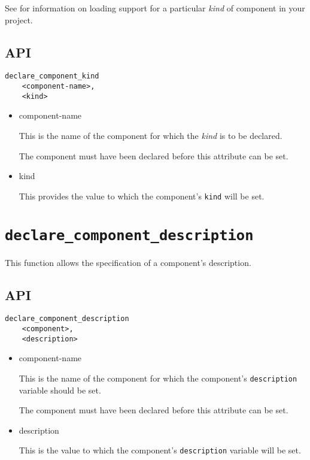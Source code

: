 See  for information on
loading support for a particular \emph{kind} of component in your
project.

\subsection{API}

\begin{verbatim}
declare_component_kind
    <component-name>,
    <kind>
\end{verbatim}

\begin{itemize}
\item component-name

  This is the name of the component for which the \emph{kind} is to be declared.

  The component must have been declared before this attribute can be
  set.

\item kind

  This provides the value to which the component's \texttt{kind} will
  be set.
\end{itemize}

\section{\texttt{declare\_component\_description}}\label{api:description}

This function allows the specification of a component's description.

\subsection{API}

\begin{verbatim}
declare_component_description
    <component>,
    <description>
\end{verbatim}

\begin{itemize}
\item component-name

  This is the name of the component for which the component's
  \texttt{description} variable should be set.

  The component must have been declared before this attribute can be
  set.

\item description

  This is the value to which the component's \texttt{description}
  variable will be set.

\end{itemize}

